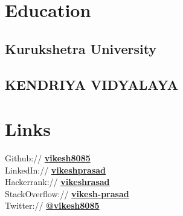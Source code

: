 \documentclass[]{deedy-resume-openfont}
\begin{document}
%
%

%
%

%
%

\begin{minipage}[t]{0.33\textwidth} 


\section{Education} 

\subsection{Kurukshetra University}
\sectionsep

\subsection{KENDRIYA VIDYALAYA}
\sectionsep



\section{Links} 
Github:// \href{https://github.com/Vikesh8085}{\bf vikesh8085} \\
LinkedIn://  \href{https://www.linkedin.com/in/vikeshprasad/}{\bf vikeshprasad} \\
Hackerrank://  \href{https://www.hackerrank.com/vikesh_prasad?hr_r=1/}{\bf vikeshrasad} \\
StackOverflow://  \href{https://stackoverflow.com/users/5059864/vikesh-prasad}{\bf vikesh-prasad} \\
Twitter://  \href{https://twitter.com/vikesh8085}{\bf @vikesh8085} \\
\sectionsep



\end{minipage}
\end{document}
